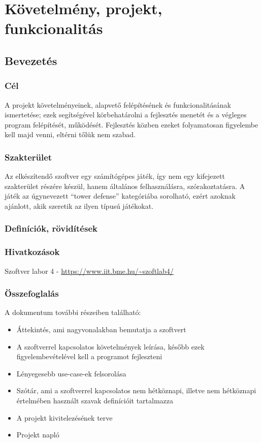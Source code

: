 %

\chapter{Követelmény, projekt, funkcionalitás}

\thispagestyle{fancy}

\section{Bevezetés}

\subsection{Cél}
A projekt követelményeinek, alapvető felépítésének és funkcionalitásának ismertetése; ezek segítségével körbehatárolni a fejlesztés menetét és a végleges program felépítését, működését. Fejlesztés közben ezeket folyamatosan figyelembe kell majd venni, eltérni tőlük nem szabad.

\subsection{Szakterület}
Az elkészítendő szoftver egy számítógépes játék, így nem egy kifejezett szakterület részére készül, hanem általános felhasználásra, szórakoztatásra. A játék az úgynevezett ``tower defense'' kategóriába sorolható, ezért azoknak ajánlott, akik szeretik az ilyen típusú játékokat.
\subsection{Definíciók, rövidítések}

\subsection{Hivatkozások}
Szoftver labor 4 - \url{https://www.iit.bme.hu/~szoftlab4/}

\subsection{Összefoglalás}
A dokumentum további részeiben található:
\begin{itemize}
\item Áttekintés, ami nagyvonalakban bemutatja a szoftvert
\item A szoftverrel kapcsolatos követelmények leírása, később ezek figyelembevételével kell a programot fejleszteni
\item Lényegesebb use-case-ek felsorolása
\item Szótár, ami a szoftverrel kapcsolatos nem hétköznapi, illetve nem hétköznapi értelmében használt szavak definícióit tartalmazza
\item A projekt kivitelezésének terve
\item Projekt napló
\end{itemize}

